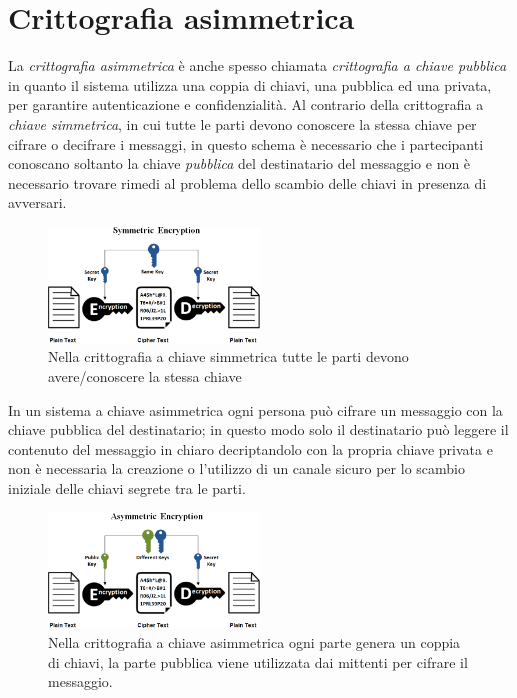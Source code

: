 \section{Crittografia asimmetrica}
La \textit{crittografia asimmetrica} è anche spesso chiamata \textit{crittografia a chiave pubblica} in quanto il sistema utilizza una coppia di chiavi, una pubblica ed una privata, per garantire autenticazione e confidenzialità.
Al contrario della crittografia a \textit{chiave simmetrica}, in cui tutte le parti devono conoscere la stessa chiave per cifrare o decifrare i messaggi, in questo schema è necessario che i partecipanti conoscano soltanto la chiave \textit{pubblica} del destinatario del messaggio e non è necessario trovare rimedi al problema dello scambio delle chiavi in presenza di avversari.
\begin{figure}[H]
    \centering
    \includegraphics[width=0.5\textwidth]{images/simmetric.png}
    \caption{Nella crittografia a chiave simmetrica tutte le parti devono avere/conoscere la stessa chiave}
\end{figure}
In un sistema a chiave asimmetrica ogni persona può cifrare un messaggio con la chiave pubblica del destinatario; in questo modo solo il destinatario può leggere il contenuto del messaggio in chiaro decriptandolo con la propria chiave privata e non è necessaria la creazione o l'utilizzo di un canale sicuro per lo scambio iniziale delle chiavi segrete tra le parti.
\begin{figure}
    \centering
    \includegraphics[width=0.5\textwidth]{images/asymmetric.png}
    \caption{Nella crittografia a chiave asimmetrica ogni parte genera un coppia di chiavi, la parte pubblica viene utilizzata dai mittenti per cifrare il messaggio.}
\end{figure}
